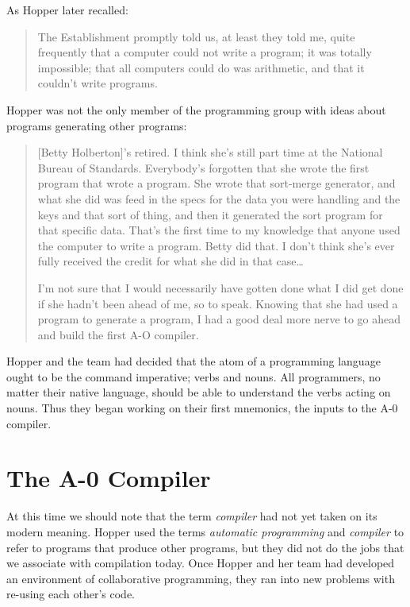 As Hopper later recalled:
\begin{quotation}
  The Establishment promptly told us, at least they told me, quite
  frequently that a
  computer could not write a program; it was totally impossible; that
  all computers
  could do was arithmetic, and that it couldn't write programs.
  \cite{hopl_keynote}
\end{quotation}

Hopper was not the only member of the programming group with ideas about
programs generating other programs:

\begin{quotation}
  [Betty Holberton]'s retired. I think she's still part time at the
  National Bureau of Standards.
  Everybody's forgotten that she wrote the first program that wrote a
  program. She wrote that
  sort-merge generator, and what she did was feed in the specs for
  the data you were handling
  and the keys and that sort of thing, and then it generated the sort
  program for that specific data.
  That's the first time to my knowledge that anyone used the computer
  to write a program. Betty
  did that. I don't think she's ever fully received the credit for
  what she did in that case\dots

  I'm not sure that I would necessarily have gotten done what I did get done if
  she hadn't been ahead of me, so to speak. Knowing that she had used a program
  to generate a program, I had a good deal more nerve to go ahead and build the
  first A-O compiler.
\end{quotation}

Hopper and the team had decided that the atom of a programming language ought
to be the command imperative; verbs and nouns. All programmers, no matter
their native language, should be able to understand the verbs acting on nouns.
Thus they began working on their first mnemonics, the inputs to the A-0
compiler.

\section{The A-0 Compiler}

At this time we should note that the term \textit{compiler} had not yet taken
on its modern meaning. Hopper used the terms \textit{automatic programming} and
\textit{compiler} to refer to programs that produce other programs, but they
did not do the jobs that we associate with compilation today. Once Hopper and
her team had developed an environment of collaborative programming, they ran
into new problems with re-using each other's code.

